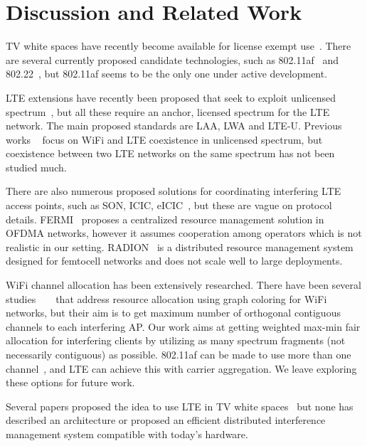 \section{Discussion and Related Work}








TV white spaces have recently become available for license exempt use~\cite{fcc, etsi_tvws}. 
There are several currently proposed candidate technologies, such as 802.11af~\cite{Rice_af} and 802.22~\cite{wifi80222}, 
but 802.11af seems to be the only one under active development. 

LTE extensions have recently been proposed that seek to exploit unlicensed spectrum~\cite{qualcomm-lte-unlicensed,huawei-lte-unlicensed,ericsson-unlicensed}, but all these require an anchor, licensed spectrum for the LTE network.
The main proposed standards are LAA, LWA and LTE-U. 
Previous works ~\cite{co-existence, lteu-google} focus on WiFi and LTE coexistence in unlicensed spectrum, but coexistence between two LTE networks on the same spectrum has not been studied much.

There are also numerous proposed solutions for coordinating interfering LTE access points, such as SON, ICIC, eICIC~\cite{smallcellbook}, 
but these are vague on protocol details. 
FERMI~\cite{fermi} proposes a centralized resource management solution in OFDMA networks, however it assumes cooperation among operators which is not realistic in our setting.
RADION~\cite{radion} is a distributed resource management system designed for femtocell networks and does not scale well to large deployments.

WiFi channel allocation has been extensively researched. 
There have been several studies ~\cite{client-deriven} ~\cite{load-aware} that address resource allocation using graph coloring for WiFi networks, but their aim is to get maximum number of orthogonal contiguous channels to each interfering AP. Our work aims at getting weighted max-min fair allocation for interfering clients by utilizing as many spectrum fragments (not necessarily contiguous) as possible.
\wf 802.11af can be made to use more than one channel~\cite{whitefi}, and  LTE can achieve this with 
carrier aggregation. We leave exploring these options for future work. 

Several papers proposed the idea to use LTE in TV white spaces~\cite{dyspan_lte12, radisys} but none has described an
 architecture or proposed an efficient distributed interference management system compatible with today's hardware. 


